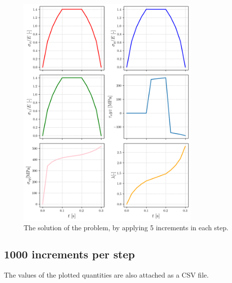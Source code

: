 \documentclass[12pt,a4paper]{article}
\begin{document}
\begin{figure}[h]
    \centering
    \includegraphics[width=0.8\textwidth]{figures/sol_5incr.png}
    \caption{The solution of the problem, by applying 5 increments in each step.}
    \label{fig:sol_5incr}
\end{figure}

\newpage

\subsection*{1000 increments per step}

The values of the plotted quantities are also attached as a CSV file.
\end{document}
